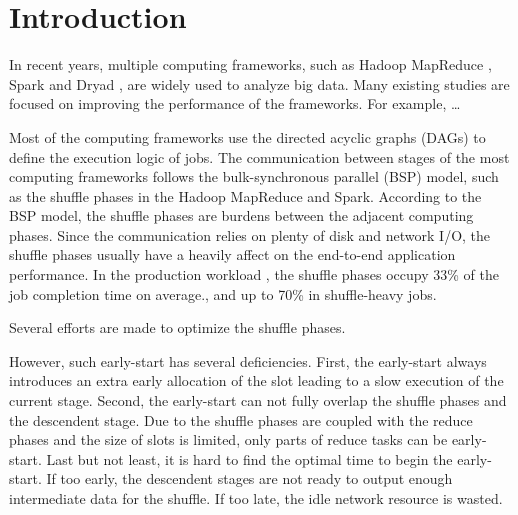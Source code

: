 \section{Introduction}
In recent years, multiple computing frameworks, such as Hadoop MapReduce \cite{}, Spark \cite{} and Dryad \cite{}, are widely used to analyze big data.
Many existing studies are focused on improving the performance of the frameworks.
For example, \dots

Most of the computing frameworks use the directed acyclic graphs (DAGs) to define the execution logic of jobs.
The communication between stages of the most computing frameworks follows the bulk-synchronous parallel (BSP) model, such as the shuffle phases in the Hadoop MapReduce and Spark.
According to the BSP model, the shuffle phases are burdens between the adjacent computing phases.
Since the communication relies on plenty of disk and network I/O, the shuffle phases usually have a heavily affect on the end-to-end application performance.
In the production workload \cite{}, the shuffle phases occupy 33\% of the job completion time on average., and up to 70\% in shuffle-heavy jobs. 

Several efforts are made to optimize the shuffle phases.

However, such early-start has several deficiencies.
First, the early-start always introduces an extra early allocation of the slot leading to a slow execution of the current stage.
Second, the early-start can not fully overlap the shuffle phases and the descendent stage. Due to the shuffle phases are coupled with the reduce phases and the size of slots is limited, only parts of reduce tasks can be early-start. 
Last but not least, it is hard to find the optimal time to begin the early-start. If too early, the descendent stages are not ready to output enough intermediate data for the shuffle. If too late, the idle network resource is wasted.